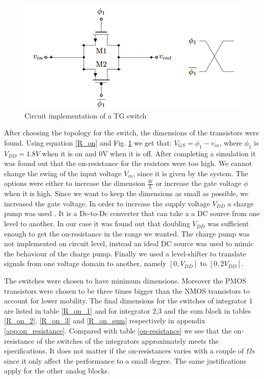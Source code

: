 \begin{figure}[h]
\centering
\includegraphics[scale=0.7]{images/TG_switch.png}
\caption{Circuit implementation of a TG switch}
\label{fig:TG_switch}
\end{figure}

After choosing the topology for the switch, the dimensions of the transistors were found. Using equation \ref{R_on} and Fig. \ref{fig:TG_switch} we get that: $V_{GS} = \phi_1 - v_{in}$, where $\phi_1$ is $V_{DD}=1.8V$ when it is on and 0V when it is off. After completing a simulation it was found out that the on-resistance for the resistors were too high. We cannot change the swing of the input voltage $V_{in}$, since it is given by the system. The options were either to increase the dimension $\frac{W}{L}$ or increase the gate voltage $\phi$ when it is high. Since we want to keep the dimensions as small as possible, we increased the gate voltage. In order to increase the supply voltage $V_{DD}$ a charge pump was used \cite{charge_pump}. It is a Dc-to-Dc converter that can take a a DC source from one level to another. In our case it was found out that doubling $V_{DD}$ was sufficient enough to get the on-resistance in the range we wanted. The charge pump was not implemented on circuit level, instead an ideal DC source was used to mimic the behaviour of the charge pump. Finally we used a level-shifter \cite{William} to translate signals from one voltage domain to another, namely $[0,V_{DD}]$ to $[0,2V_{DD}]$. 

The switches were chosen to have minimum dimensions. Moreover the PMOS transistors were chosen to be three times bigger than the NMOS transistors to account for lower mobility. The final dimensions for the switches of integrator 1 are listed in table \ref{R_on_1} and for integrator 2,3 and the sum block in tables \ref{R_on_2}, \ref{R_on_3} and \ref{R_on_sum} respectively in appendix \ref{app:on_resistance}. Compared with table \ref{on-resistance} we see that the on-resistance of the switches of the integrators approximately meets the specifications. It does not matter if the on-resistances varies with a couple of $\Omega s$ since it only affect the performance to a small degree. The same justifications apply for the other analog blocks. 

